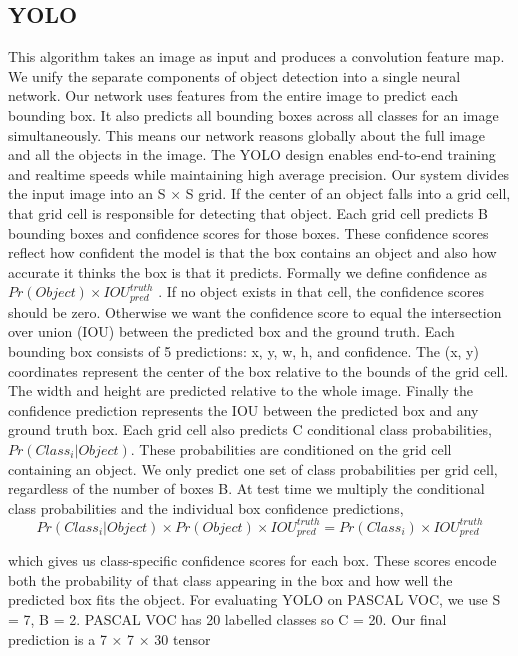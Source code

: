 \documentclass[12pt, a4paper, twoside]{article}
\begin{document}
	\subsection{YOLO}
	This algorithm\cite{yolo} takes an image as input and produces a convolution feature map. We unify the separate components of object detection into a single neural network. Our network uses features from the entire image to predict each bounding box. It also predicts all bounding boxes across all classes for an image simultaneously. This means our network reasons globally about the full image and all the objects in the image. The YOLO design enables end-to-end training and realtime speeds while maintaining high average precision. Our system divides the input image into an S × S grid. If the center of an object falls into a grid cell, that grid cell
	is responsible for detecting that object. Each grid cell predicts B bounding boxes and confidence scores for those boxes. These confidence scores reflect how
	confident the model is that the box contains an object and also how accurate it thinks the box is that it predicts. Formally we define confidence as $Pr(Object) \times IOU^{truth}_{pred}$ . If no object exists in that cell, the confidence scores should be
	zero. Otherwise we want the confidence score to equal the intersection over union (IOU) between the predicted box and the ground truth.
	Each bounding box consists of 5 predictions: x, y, w, h, and confidence. The (x, y) coordinates represent the center of the box relative to the bounds of the grid cell. The width and height are predicted relative to the whole image. Finally the confidence prediction represents the IOU between the predicted box and any ground truth box.
	Each grid cell also predicts C conditional class probabilities, $Pr(Class_i
	|Object)$. These probabilities are conditioned on the grid cell containing an object. We only predict one set of class probabilities per grid cell, regardless of the
	number of boxes B. At test time we multiply the conditional class probabilities and the individual box confidence predictions,
	\begin{equation}
		Pr(Class_i|Object) \times Pr(Object) \times IOU^{truth}_{pred} = Pr(Class_i) \times IOU^{truth}_{pred}
	\end{equation}

	which gives us class-specific confidence scores for each box. These scores encode both the probability of that class appearing in the box and how well the predicted box fits the object.
	For evaluating YOLO on PASCAL VOC, we use S = 7, B = 2. PASCAL VOC has 20 labelled classes so C = 20.
	Our final prediction is a 7 × 7 × 30 tensor
	
\end{document}
